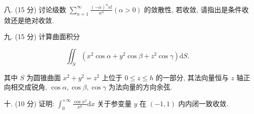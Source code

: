 \documentclass{examcollection}
\renewcommand{\displayformula}[1]{\[#1\]}
\begin{document}
{\begin{minipage}{\textwidth}
八. (15 分) 讨论级数 $\sum_{n=1}^{\infty} \frac{(-\alpha)^n n!}{n^n} (\alpha > 0)$ 的敛散性, 若收敛, 请指出是条件收敛还是绝对收敛.\par
九. (15 分) 计算曲面积分\par
\displayformula{\iint_ {S} \left(x ^ {2} \cos \alpha + y ^ {2} \cos \beta + z ^ {2} \cos \gamma\right) \mathrm{d} S.}\par
其中 $S$ 为圆锥曲面 $x^{2} + y^{2} = z^{2}$ 上位于 $0 \leq z \leq h$ 的一部分, 其法向量恒与 $z$ 轴正向相交成锐角, $\cos \alpha, \cos \beta, \cos \gamma$ 为法向量的方向余弦.\par
十. (10 分) 证明: $\int_{0}^{+\infty} \frac{\cos x^{2}}{x^{y}} \mathrm{d}x$ 关于参变量 $y$ 在 $(-1,1)$ 内内闭一致收敛.\par
\end{minipage}}
\ifdim\dimexpr\ht\proofbox+\dp\proofbox\relax>\textheight
\noindent\resizebox{!}{\textheight}{\usebox{\proofbox}}\else\noindent\usebox{\proofbox}\fi\clearpage
\end{document}

